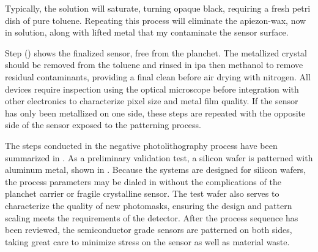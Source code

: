 \documentclass[../../main.tex]{subfiles}
\begin{document}
    Typically, the solution will saturate, turning opaque black, requiring a fresh petri dish of pure toluene.
    Repeating this process will eliminate the \gls{apiezon-wax}, now in solution, along with lifted metal that my contaminate the sensor surface.
    \par%
    Step () shows the finalized sensor, free from the planchet.
    The metallized crystal should be removed from the toluene and rinsed in \gls{ipa} then \gls{methanol} to remove residual contaminants, providing a final clean before air drying with nitrogen.    
    All devices require inspection using the optical microscope before integration with other electronics to characterize pixel size and metal film quality.
    If the sensor has only been metallized on one side, these steps are repeated with the opposite side of the sensor exposed to the patterning process.
    \par%
    The steps conducted in the negative photolithography process have been summarized in .
    As a preliminary validation test, a silicon wafer is patterned with aluminum metal, shown in .
    Because the systems are designed for silicon wafers, the process parameters may be dialed in without the complications of the planchet carrier or fragile crystalline sensor.
    The test wafer also serves to characterize the quality of new photomasks, ensuring the design and pattern scaling meets the requirements of the detector.
    After the process sequence has been reviewed, the semiconductor grade sensors are patterned on both sides, taking great care to minimize stress on the sensor as well as material waste.
\end{document}
